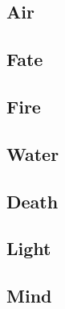 \begin{multicols}{2}

\subsection{Air}



\subsection{Fate}

%

\subsection{Fire}

%

\subsection{Water}

%

\subsection{Death}



\subsection{Light}



\subsection{Mind}

%

\end{multicols}
